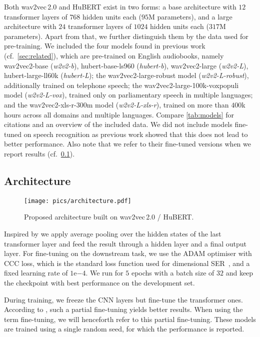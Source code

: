 \documentclass{article}
\newcommand\wbase{\mbox{\emph{w2v2-b}}}
\newcommand\hbase{\mbox{\emph{hubert-b}}}
\newcommand\wlarge{\mbox{\emph{w2v2-L}}}
\newcommand\hlarge{\mbox{\emph{hubert-L}}}
\newcommand\wrobust{\mbox{\emph{w2v2-L-robust}}}
\newcommand\wvox{\mbox{\emph{w2v2-L-vox}}}
\newcommand\wxlsr{\mbox{\emph{w2v2-L-xls-r}}}
\newcommand{\wtov}{wav2vec\,2.0}
\newcommand{\hubert}{HuBERT}
\newcommand{\cf}{{cf.\ }}
\begin{document}
Both {\wtov} and {\hubert} exist in two forms:
a base architecture with $12$ transformer layers of $768$ hidden units each ($95$M parameters),
and a large architecture with $24$ transformer layers of $1024$ hidden units each ($317$M parameters). 
Apart from that, we further distinguish them by the data used for pre-training.
We included the four models found in previous work (\cf \cref{sec:related}),
which are pre-trained on English audiobooks,
namely
wav2vec2-base (\wbase),
hubert-base-ls960 (\hbase),
wav2vec2-large (\wlarge),
hubert-large-ll60k (\hlarge);
the wav2vec2-large-robust model (\wrobust),
additionally trained on telephone speech;
the wav2vec2-large-100k-voxpopuli model (\wvox),
trained only on parliamentary speech in multiple languages;
and the wav2vec2-xls-r-300m model (\wxlsr),
trained on more than $400$k hours across all domains and multiple languages.
Compare \cref{tab:models} for citations and an overview of the included data.
We did not include models fine-tuned on speech recognition
as previous work showed that this does not lead to better performance.
Also note that we refer to their fine-tuned versions when we report results (\cf \cref{subsec:architecture}).





\subsection{Architecture}
\label{subsec:architecture}

\begin{figure}[t]
    \centering
    \texttt{[image: pics/architecture.pdf]}
    \caption{Proposed architecture built on {\wtov} / {\hubert}.}
    \label{fig:architecture}
\end{figure}

Inspired by \citet{wang2021finetuned}
we apply average pooling over the hidden states of the last transformer layer
and feed the result through a hidden layer and a final output layer. For fine-tuning on the downstream task,
we use the ADAM optimiser with \ac{CCC} loss,
which is the standard loss function
used for dimensional \ac{SER}~\citep{Trigeorgis16-AFE, li2021contrastive, triantafyllopoulos2021multistage},
and a fixed learning rate of $1\mathrm{e}{-4}$.
We run for $5$ epochs with a batch size of $32$
and keep the checkpoint with best performance on the development set. 

During training,
we freeze the CNN layers but fine-tune the transformer ones. 
According to \citet{wang2021finetuned},
such a partial fine-tuning yields better results.
When using the term fine-tuning,
we will henceforth refer to this partial fine-tuning.
These models are trained using a single random seed,
for which the performance is reported. 
\end{document}
